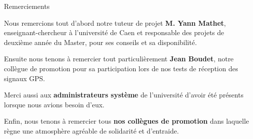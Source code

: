 {\Huge{Remerciements}}

\vspace{2cm}
Nous remercions tout d'abord notre tuteur de projet {\bfseries M. Yann Mathet}, enseignant-chercheur à l'université de Caen et responsable des projets de deuxième année du Master, pour ses conseils et sa disponibilité.\bigskip

Ensuite nous tenons à remercier tout particulièrement {\bfseries Jean Boudet}, notre collègue de promotion pour sa participation lors de nos tests de réception des signaux GPS.\bigskip

Merci aussi aux {\bfseries administrateurs système} de l'université d'avoir été présents lorsque nous avions besoin d'eux.\bigskip

Enfin, nous tenons à remercier tous {\bfseries nos collègues de promotion} dans laquelle règne une atmosphère agréable de solidarité et d'entraide.\bigskip

